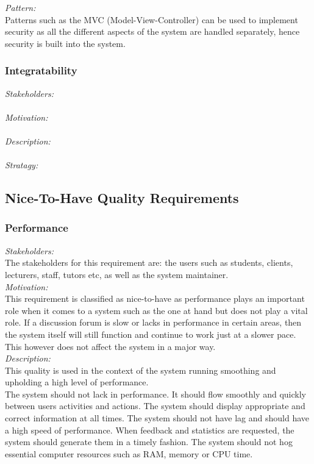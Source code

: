 \documentclass[a4paper,12pt]{report}
\begin{document}
		\emph{Pattern: } \\ Patterns such as the MVC (Model-View-Controller) can be used to implement security as all the different aspects of the system are handled separately, hence security is built into the system.\\
			
			
		\subsubsection{Integratability}
		\emph{Stakeholders: }\\
		\\\emph{Motivation: }\\
		\\\emph{Description: }\\
		\\\emph{Stratagy: }\\
		
	\subsection{Nice-To-Have Quality Requirements}
		\subsubsection{Performance}
		\emph{Stakeholders: }\\ The stakeholders for this requirement are: the users such as students, clients, lecturers, staff, tutors etc, as well as the system maintainer.\\
		
		\emph{Motivation: }\\ This requirement is classified as nice-to-have  as performance plays an important role when it comes to a system such as the one at hand but does not play a vital role. If a discussion forum is slow or lacks in performance in certain areas, then the system itself will still function and continue to work just at a slower pace. This however does not affect the system in a major way.	\\
		
		\emph{Description: }\\This quality is used in the context of the system running smoothing and upholding a high level of performance. \\
		The system should not lack in performance. It should flow smoothly and quickly between users activities and actions. The system should display appropriate and correct information at all times. The system should not have lag and should have a high speed of performance. When feedback and statistics are requested, the system should generate them in a timely fashion. The system should not hog essential computer resources such as RAM, memory or CPU time.\\
		
\end{document}
